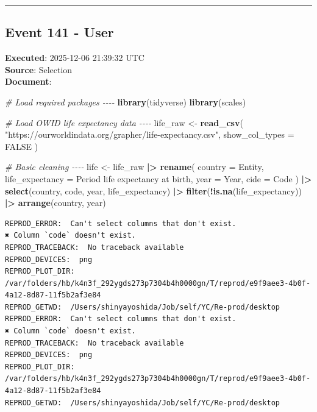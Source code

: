 \documentclass[
  11pt,
]{article}
\newenvironment{Shaded}{\begin{snugshade}}{\end{snugshade}}
\newcommand{\AttributeTok}[1]{\textcolor[rgb]{0.13,0.29,0.53}{#1}}
\newcommand{\CommentTok}[1]{\textcolor[rgb]{0.56,0.35,0.01}{\textit{#1}}}
\newcommand{\ConstantTok}[1]{\textcolor[rgb]{0.56,0.35,0.01}{#1}}
\newcommand{\FunctionTok}[1]{\textcolor[rgb]{0.13,0.29,0.53}{\textbf{#1}}}
\newcommand{\NormalTok}[1]{#1}
\newcommand{\OtherTok}[1]{\textcolor[rgb]{0.56,0.35,0.01}{#1}}
\newcommand{\SpecialCharTok}[1]{\textcolor[rgb]{0.81,0.36,0.00}{\textbf{#1}}}
\newcommand{\StringTok}[1]{\textcolor[rgb]{0.31,0.60,0.02}{#1}}
\newenvironment{rpoutput}{\vspace{0.5em}\begin{snugshade}}{\end{snugshade}}
\begin{document}
\begin{center}\rule{0.5\linewidth}{0.5pt}\end{center}

\subsection{Event 141 - User}\label{event-141---user}

\textbf{Executed}: 2025-12-06 21:39:32 UTC\\
\textbf{Source}: Selection\\
\textbf{Document}:

\begin{Shaded}
\begin{Highlighting}[]
\CommentTok{\# Load required packages {-}{-}{-}{-}}
\FunctionTok{library}\NormalTok{(tidyverse)}
\FunctionTok{library}\NormalTok{(scales)}

\CommentTok{\# Load OWID life expectancy data {-}{-}{-}{-}}
\NormalTok{life\_raw }\OtherTok{\textless{}{-}} \FunctionTok{read\_csv}\NormalTok{(}
  \StringTok{"https://ourworldindata.org/grapher/life{-}expectancy.csv"}\NormalTok{,}
  \AttributeTok{show\_col\_types =} \ConstantTok{FALSE}
\NormalTok{)}

\CommentTok{\# Basic cleaning {-}{-}{-}{-}}
\NormalTok{life }\OtherTok{\textless{}{-}}\NormalTok{ life\_raw }\SpecialCharTok{|\textgreater{}}
  \FunctionTok{rename}\NormalTok{(}
    \AttributeTok{country =}\NormalTok{ Entity,}
    \AttributeTok{life\_expectancy =} \StringTok{\textasciigrave{}}\AttributeTok{Period life expectancy at birth}\StringTok{\textasciigrave{}}\NormalTok{,}
    \AttributeTok{year =}\NormalTok{ Year,}
    \AttributeTok{cide =}\NormalTok{ Code}
\NormalTok{  ) }\SpecialCharTok{|\textgreater{}}
  \FunctionTok{select}\NormalTok{(country, code, year, life\_expectancy) }\SpecialCharTok{|\textgreater{}}
  \FunctionTok{filter}\NormalTok{(}\SpecialCharTok{!}\FunctionTok{is.na}\NormalTok{(life\_expectancy)) }\SpecialCharTok{|\textgreater{}}
  \FunctionTok{arrange}\NormalTok{(country, year)}
\end{Highlighting}
\end{Shaded}

\begin{rpoutput}

\begin{verbatim}
REPROD_ERROR:  Can't select columns that don't exist.
✖ Column `code` doesn't exist. 
REPROD_TRACEBACK:  No traceback available  
REPROD_DEVICES:  png 
REPROD_PLOT_DIR:  /var/folders/hb/k4n3f_292ygds273p7304b4h0000gn/T/reprod/e9f9aee3-4b0f-4a12-8d87-11f5b2af3e84 
REPROD_GETWD:  /Users/shinyayoshida/Job/self/YC/Re-prod/desktop 
REPROD_ERROR:  Can't select columns that don't exist.
✖ Column `code` doesn't exist. 
REPROD_TRACEBACK:  No traceback available  
REPROD_DEVICES:  png 
REPROD_PLOT_DIR:  /var/folders/hb/k4n3f_292ygds273p7304b4h0000gn/T/reprod/e9f9aee3-4b0f-4a12-8d87-11f5b2af3e84 
REPROD_GETWD:  /Users/shinyayoshida/Job/self/YC/Re-prod/desktop 
\end{verbatim}

\end{rpoutput}
\end{document}
